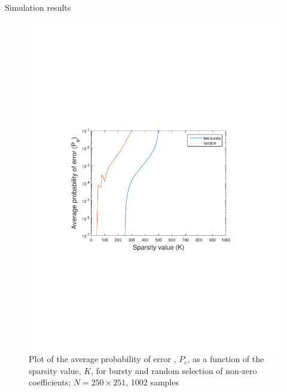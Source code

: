 \documentclass[10pt,xcolor=table]{beamer}
\begin{document}
	\begin{frame}{Simulation results}
		
		
		\begin{figure}[t]
			\centering
			\includegraphics[width=3.5 in]{./Figures/Average_Perror_K_250_251_semilog.pdf}
			\vspace{-4mm}
			\caption{Plot of the average probability of error , $P_e$, as a function of the sparsity value, $K$, for bursty and random selection of non-zero coefficients; $N=250\times251$, 1002 samples}
			\label{fig:probofsuccess250_251}
		\end{figure}
		
	\end{frame}
\end{document}

